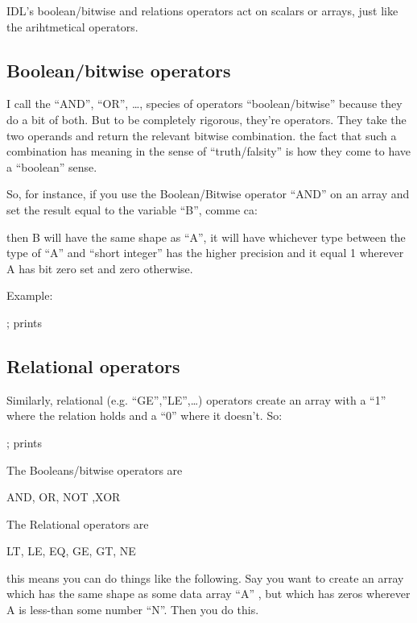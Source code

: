  IDL's boolean/bitwise and relations operators act on scalars or
  arrays, just like the arihtmetical operators.  

  \subsection{Boolean/bitwise operators}\label{qs-boolean-bitwise-ops}
  I call the ``AND'',
  ``OR'', \ldots, species of operators ``boolean/bitwise'' because they
  do a bit of both. But to be completely rigorous, they're 
  operators. They take the two operands and return the relevant bitwise
  combination. the fact that such a combination has meaning in the sense
  of ``truth/falsity'' is how they come to have a ``boolean'' sense.

  So, for instance, if you use the Boolean/Bitwise operator ``AND'' on
  an array and set the result equal to the variable ``B'', comme ca:


  then B will have the same shape as ``A'', it will have whichever type
  between the type of ``A'' and ``short integer'' has the higher
  precision and it equal 1 wherever A has bit zero set and zero
  otherwise.

  Example:

   ; prints




  \subsection{Relational operators}\label{qs-relational-ops}

  Similarly, relational (e.g. ``GE'',''LE'',\ldots) operators create an
  array with a ``1'' where the relation holds and a ``0'' where it
  doesn't. So:

  ; prints

  
  The Booleans/bitwise operators  are

  AND, OR, NOT ,XOR

  The Relational operators are

  LT, LE, EQ, GE, GT, NE

  this means you can do things like the following. Say you want to
  create an array which has the same shape as some data array ``A'' , but
  which has zeros wherever A is less-than some number ``N''. Then you
  do this.

